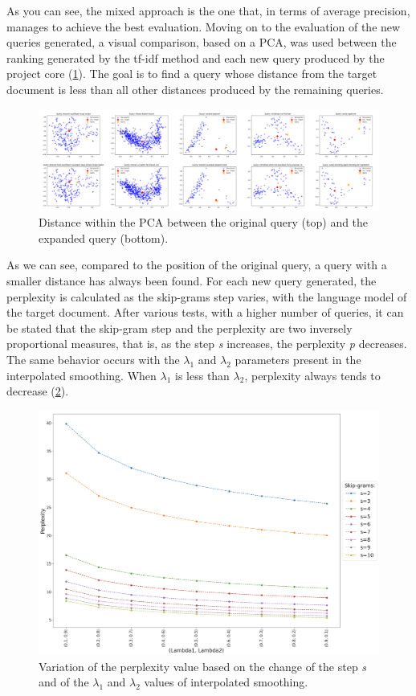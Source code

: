 As you can see, the mixed approach is the one that, in terms of average precision, manages to achieve the best evaluation.
Moving on to the evaluation of the new queries generated, a visual comparison, based on a PCA, was used between the ranking 
generated by the tf-idf method and each new query produced by the project core (\ref{PCA}). The goal is to find a query whose distance 
from the target document is less than all other distances produced by the remaining queries.
\begin{figure}[h!]
    \centering
    \includegraphics[width =\linewidth]{images/PCA paper/PCA all.png}
    \centering
    \caption{Distance within the PCA between the original query (top) and the expanded query (bottom).}
    \label{PCA}
\end{figure}
As we can see, compared to the position of the original query, a query with a smaller distance has always been found.
For each new query generated, the perplexity is calculated as the skip-grams step varies, with the language model of the target document.
After various tests, with a higher number of queries, it can be stated that the skip-gram step and the perplexity are two inversely proportional 
measures, that is, as the step \emph{s} increases, the perplexity \emph{p} decreases. The same behavior occurs with the $\lambda_1$ and $\lambda_2$ parameters present in the interpolated smoothing. 
When  $\lambda_1$ is less than  $\lambda_2$, perplexity always tends to decrease (\ref{perplexity}).
\begin{figure}[h!]
    \centering
    \includegraphics[width =0.8\linewidth]{images/perplexity.png}
    \centering
    \caption{Variation of the perplexity value based on the change of the step \emph{s} and of the $\lambda_1$ and $\lambda_2$ values of interpolated smoothing.}
    \label{perplexity}
\end{figure}
